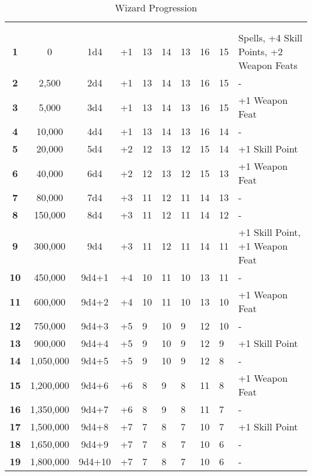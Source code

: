 \begin {table}[H]
  \caption{Wizard Progression}
	\begin{tabularx}{\columnwidth}{>{\bfseries}cccM{.31in}M{.51in}M{.25in}M{.43in}M{.32in}M{.45in}Y}
    \thead{}&\thead{}&\thead{}&\thead{}&\thead{}&\setcounter{rownum}{0}\\
     &  &  &  &  &  &  &  &  & \\
		1 & 0 & 1d4 & +1 & 13 & 14 & 13 & 16 & 15 & Spells, +4 Skill Points, +2 Weapon Feats\\
		2 & 2,500 & 2d4 & +1 & 13 & 14 & 13 & 16 & 15 & -\\
		3 & 5,000 & 3d4 & +1 & 13 & 14 & 13 & 16 & 15 & +1 Weapon Feat\\
		4 & 10,000 & 4d4 & +1 & 13 & 14 & 13 & 16 & 14 & -\\
		5 & 20,000 & 5d4 & +2 & 12 & 13 & 12 & 15 & 14 & +1 Skill Point\\
		6 & 40,000 & 6d4 & +2 & 12 & 13 & 12 & 15 & 13 & +1 Weapon Feat\\
		7 & 80,000 & 7d4 & +3 & 11 & 12 & 11 & 14 & 13 & -\\
		8 & 150,000 & 8d4 & +3 & 11 & 12 & 11 & 14 & 12 & -\\
		9 & 300,000 & 9d4 & +3 & 11 & 12 & 11 & 14 & 11 & +1 Skill Point, +1 Weapon Feat\\
		10 & 450,000 & 9d4+1 & +4 & 10 & 11 & 10 & 13 & 11 & -\\
		11 & 600,000 & 9d4+2 & +4 & 10 & 11 & 10 & 13 & 10 & +1 Weapon Feat\\
		12 & 750,000 & 9d4+3 & +5 & 9 & 10 & 9 & 12 & 10 & -\\
		13 & 900,000 & 9d4+4 & +5 & 9 & 10 & 9 & 12 & 9 & +1 Skill Point\\
		14 & 1,050,000 & 9d4+5 & +5 & 9 & 10 & 9 & 12 & 8 & -\\
		15 & 1,200,000 & 9d4+6 & +6 & 8 & 9 & 8 & 11 & 8 & +1 Weapon Feat\\
		16 & 1,350,000 & 9d4+7 & +6 & 8 & 9 & 8 & 11 & 7 & -\\
		17 & 1,500,000 & 9d4+8 & +7 & 7 & 8 & 7 & 10 & 7 & +1 Skill Point\\
		18 & 1,650,000 & 9d4+9 & +7 & 7 & 8 & 7 & 10 & 6 & -\\
		19 & 1,800,000 & 9d4+10 & +7 & 7 & 8 & 7 & 10 & 6 & -\\

\end{tabularx}
\end{table}
